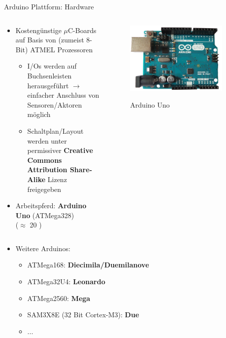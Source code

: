 \documentclass{beamer}
\begin{document}
\begin{frame}{Arduino Plattform: Hardware}
\begin{columns}
 \begin{column}{0.7\textwidth}
 \begin{itemize}
  \item Kosteng\"unstige $\mu$C-Boards auf Basis von (zumeist 8-Bit) ATMEL Prozessoren
  \begin{itemize}
  	\item I/Os werden auf Buchsenleisten herausgef\"uhrt $\rightarrow$ einfacher Anschluss von Sensoren/Aktoren m\"oglich
  	\item Schaltplan/Layout werden unter permissiver \textbf{Creative Commons Attribution Share-Alike} Lizenz freigegeben
  \end{itemize}
 \end{itemize}
 \begin{itemize}
  \item Arbeitspferd: \textbf{Arduino Uno} (ATMega328)\\($\approx$ 20 \EUR{}) 
 \end{itemize}
 \end{column}
 \begin{column}{0.3\textwidth}
  \begin{figure}[H]
   \centering
   \includegraphics[width=0.9\textwidth]{./images/arduino-uno.jpg}
   \label{fig:arduino-uno}
   \caption{Arduino Uno\cite{Image:ArduinoUno}}
  \end{figure}
 \end{column}
\end{columns}
 \begin{itemize}
 	\item Weitere Arduinos:
 	\begin{itemize}
 		\item ATMega168: \textbf{Diecimila/Duemilanove}
 		\item ATMega32U4: \textbf{Leonardo}
 		\item ATMega2560: \textbf{Mega} 
 		\item SAM3X8E (32 Bit Cortex-M3): \textbf{Due}
 		\item ...
 	\end{itemize}
 \end{itemize}
\end{frame}
\end{document}
